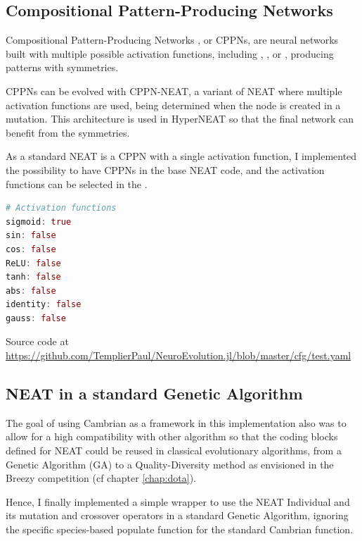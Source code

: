 \subsection{Compositional Pattern-Producing Networks}

Compositional Pattern-Producing Networks \cite{CPPN}, or CPPNs, are neural networks built with multiple possible activation functions, including , , or , producing patterns with symmetries. 

CPPNs can be evolved with CPPN-NEAT, a variant of NEAT where multiple activation functions are used, being determined when the node is created in a mutation. This architecture is used in HyperNEAT so that the final network can benefit from the symmetries. 

As a standard NEAT is a CPPN with a single activation function, I implemented the possibility to have CPPNs in the base NEAT code, and the activation functions can be selected in the .

\begin{minipage}{\linewidth}
\begin{lstlisting}[language=Julia, caption=Available activation functions in my implementation]
# Activation functions
sigmoid: true
sin: false
cos: false
ReLU: false
tanh: false
abs: false
identity: false
gauss: false
\end{lstlisting}
Source code at \url{https://github.com/TemplierPaul/NeuroEvolution.jl/blob/master/cfg/test.yaml}\\
\end{minipage}

\subsection{NEAT in a standard Genetic Algorithm}

The goal of using Cambrian as a framework in this implementation also was to allow for a high compatibility with other algorithm so that the coding blocks defined for NEAT could be reused in classical evolutionary algorithms, from a Genetic Algorithm (GA) to a Quality-Diversity method as envisioned in the Breezy competition (cf chapter \ref{chap:dota}). 

Hence, I finally implemented a simple wrapper to use the NEAT Individual and its mutation and crossover operators in a standard Genetic Algorithm, ignoring the specific species-based populate function for the standard Cambrian  function.

